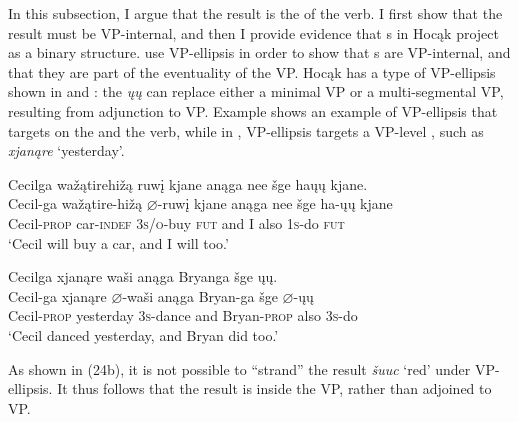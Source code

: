 \documentclass[output=paper]{LSP/langsci}
\begin{document}
In this subsection, I argue that the result  is the  of the verb. I first show that the result  must be VP-internal, and then I provide evidence that s in Hocąk project as a binary structure. \citet{LevinRappaportHovav1995} use VP-ellipsis in order to show that s are VP-internal, and that they are part of the eventuality of the VP. Hocąk has a type of VP-ellipsis shown in  and : the  \textit{ųų} can replace either a minimal VP or a multi-segmental VP, resulting from adjunction to VP. Example  shows an example of VP-ellipsis that targets on the  and the verb, while in , VP-ellipsis targets a VP-level , such as \textit{xjanąre} `yesterday'.

\begin{exe}
\ex \label{ex:rosen:22}
\glll Cecilga {\ob}{\sVP} wažątirehižą ruwį{\cb} kjane anąga nee šge {\ob}haųų{\cb} kjane.\\
Cecil-ga {} wažątire-hižą {$\varnothing$}-ruwį kjane anąga nee šge {\db}ha-ųų kjane\\
Cecil-\textsc{prop} {} car-\textsc{indef} \textsc{3s/o}-buy \textsc{fut} and I also {\db}\textsc{1s}-do \textsc{fut}\\
\glt `Cecil will buy a car, and I will too.' \citep[5]{Johnson2013}

\ex \label{ex:rosen:23}
\glll Cecilga {\ob}{\sVP} xjanąre waši{\cb} anąga Bryanga šge {\ob}ųų{\cb}.\\
Cecil-ga {} xjanąre {$\varnothing$}-waši anąga Bryan-ga šge {\db}{$\varnothing$}-ųų\\
Cecil-\textsc{prop} {} yesterday \textsc{3s}-dance and Bryan-\textsc{prop} also {\db}\textsc{3s}-do\\
\glt `Cecil danced yesterday, and Bryan did too.' \citep[6a]{Johnson2013}

\end{exe}

As shown in (24b), it is not possible to ``strand'' the result  \textit{šuuc} `red' under VP-ellipsis. It thus follows that the result is inside the VP, rather than adjoined to VP.


\ea\label{ex:rosen:24}
\end{document}
